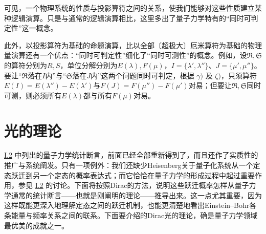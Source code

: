 \documentclass[fontsize=13pt,twoside,openany,headings=normal,parskip=false,bookmarkpackage=false,DIV=calc]{scrbook}
\begin{document}
可见，一个物理系统的性质与投影算符之间的关系，使我们能够对这些性质建立某种逻辑演算。只是与通常的逻辑演算相比，这里多出了量子力学特有的“同时可判定性”这一概念。

此外，以投影算符为基础的命题演算，比以全部〔超极大〕厄米算符为基础的物理量演算还有一个优点：“同时可判定性”细化了“同时可测性”的概念。例如，设$\mathfrak R,\allowbreak \mathfrak S$的算符分别为$R,\allowbreak S$，单位分解分别为$E(\lambda),\allowbreak F(\mu)$，$I=\{\lambda',\allowbreak \lambda''\}$、$J=\{\mu',\allowbreak \mu''\}$。要让“$\mathfrak R$落在$I$内”与“$\mathfrak S$落在$J$内”这两个问题同时可判定，根据 \hyperref[post:III.5.gamma]{$\gamma)$} 及 \hyperref[post:III.5.zeta]{$\zeta)$}，只须算符$E(I)=E(\lambda'')-E(\lambda')$与$F(J)=F(\mu'')-F(\mu')$对易；但要让$\mathfrak R,\allowbreak \mathfrak S$同时可测，则必须所有$E(\lambda)$都与所有$F(\mu)$对易。


\hypertarget{origpage-135}{}\label{origpage-135}\section{光的理论}\label{sec:III.6}
\hyperref[sec:I.2]{I.2} 中列出的量子力学统计断言，前面已经全部重新得到了，而且还作了实质性的推广与系统阐发。只有一项例外：我们还缺少Heisenberg关于量子化系统从一个定态跃迁到另一个定态的概率表达式；而它恰恰在量子力学的形成过程中起过重要作用，参见 \hyperref[sec:I.2]{I.2} 的讨论。下面将按照Dirac的方法，说明这些跃迁概率怎样从量子力学通常的统计断言——也就是刚阐明的理论——推导出来。这一点尤其重要，因为这样既能更深入地理解定态之间的跃迁机制，也能更清楚地看出Einstein–Bohr各条能量与频率关系之间的联系。下面要介绍的Dirac光的理论，确是量子力学领域最优美的成就之一。
\end{document}
